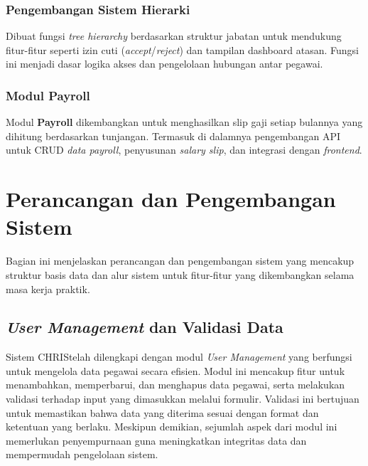 \subsubsection{Pengembangan Sistem Hierarki}

Dibuat fungsi \textit{tree hierarchy} berdasarkan struktur jabatan untuk mendukung fitur-fitur seperti izin cuti (\textit{accept}/\textit{reject}) dan tampilan dashboard atasan. Fungsi ini menjadi dasar logika akses dan pengelolaan hubungan antar pegawai.
\subsubsection{Modul Payroll}

Modul \textbf{Payroll} dikembangkan untuk menghasilkan slip gaji setiap bulannya yang dihitung berdasarkan tunjangan. Termasuk di dalamnya pengembangan API untuk CRUD \textit{data payroll}, penyusunan \textit{salary slip}, dan integrasi dengan \textit{frontend}.



\section{Perancangan dan Pengembangan Sistem}
Bagian ini menjelaskan perancangan dan pengembangan sistem yang mencakup struktur basis data dan alur sistem untuk fitur-fitur yang dikembangkan selama masa kerja praktik.

\subsection{\textit{User Management} dan Validasi Data}
Sistem CHRIS\@ telah dilengkapi dengan modul \textit{User Management} yang berfungsi untuk mengelola data pegawai secara efisien. Modul ini mencakup fitur untuk menambahkan, memperbarui, dan menghapus data pegawai, serta melakukan validasi terhadap input yang dimasukkan melalui formulir. Validasi ini bertujuan untuk memastikan bahwa data yang diterima sesuai dengan format dan ketentuan yang berlaku. Meskipun demikian, sejumlah aspek dari modul ini memerlukan penyempurnaan guna meningkatkan integritas data dan mempermudah pengelolaan sistem.

